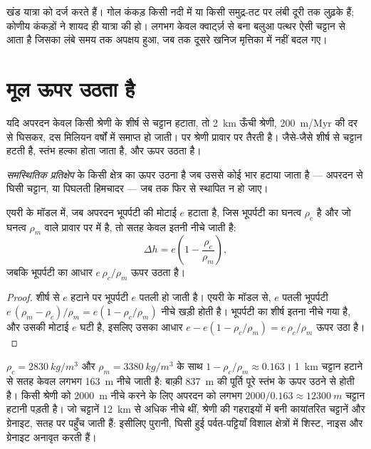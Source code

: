 खंड यात्रा को दर्ज करते हैं। गोल कंकड़ किसी नदी में या किसी समुद्र-तट पर
लंबी दूरी तक लुढ़के हैं; कोणीय कंकड़ों ने शायद ही यात्रा की हो। लगभग केवल क्वार्ट्ज़
से बना बलुआ पत्थर ऐसी चट्टान से आता है जिसका लंबे समय तक अपक्षय हुआ,
जब तक दूसरे खनिज मृत्तिका में नहीं बदल गए।

\section{मूल ऊपर उठता है}

यदि अपरदन केवल किसी श्रेणी के शीर्ष से चट्टान हटाता, तो \qty{2}{km}
ऊँची श्रेणी, \qty{200}{m/Myr} की दर से घिसकर, दस मिलियन वर्षों में समाप्त हो जाती।
पर श्रेणी प्रावार पर तैरती है। जैसे-जैसे शीर्ष से चट्टान हटती है,
स्तंभ हल्का होता जाता है, और ऊपर उठता है।

\begin{definition}[समस्थितिक प्रतिक्षेप]\label{def:g12:destruction-of-mountains:rebound}
\emph{समस्थितिक प्रतिक्षेप}  के किसी क्षेत्र का
ऊपर उठना है जब उससे कोई भार हटाया जाता है --- अपरदन से घिसी चट्टान,
या पिघलती हिमचादर --- जब तक  फिर से स्थापित न हो जाए।
\end{definition}

\begin{proposition}[अपरदन और प्रतिक्षेप]\label{prop:g12:destruction-of-mountains:rebound}
एयरी के मॉडल में, जब अपरदन भूपर्पटी की मोटाई $e$ हटाता है, जिस भूपर्पटी का घनत्व
$\rho_c$ है और जो घनत्व $\rho_m$ वाले प्रावार पर  में है, तो
सतह केवल इतनी नीचे जाती है:
\[
  \Delta h = e\left(1 - \frac{\rho_c}{\rho_m}\right),
\]
जबकि भूपर्पटी का आधार $e\,\rho_c/\rho_m$ ऊपर उठता है।
\end{proposition}

\begin{proof}
शीर्ष से $e$ हटाने पर भूपर्पटी $e$ पतली हो जाती है। एयरी के मॉडल से,
$e$ पतली भूपर्पटी $e\,(\rho_m - \rho_c)/\rho_m = e(1 -
\rho_c/\rho_m)$ नीचे खड़ी होती है। भूपर्पटी का शीर्ष इतना नीचे गया है, और उसकी
मोटाई $e$ घटी है, इसलिए उसका आधार $e - e(1 -
\rho_c/\rho_m) = e\,\rho_c/\rho_m$ ऊपर उठा है।
\end{proof}

$\rho_c = \qty{2830}{kg/m^3}$ और $\rho_m = \qty{3380}{kg/m^3}$ के साथ $1 -
\rho_c/\rho_m \approx 0.163$। \qty{1}{km} चट्टान हटाने से
सतह केवल लगभग \qty{163}{m} नीचे जाती है: बाक़ी \qty{837}{m} की पूर्ति
पूरे स्तंभ के ऊपर उठने से होती है। किसी श्रेणी को \qty{2000}{m} नीचे करने के लिए अपरदन को
लगभग $2000/0.163 \approx \qty{12300}{m}$ चट्टान हटानी पड़ती है। जो चट्टानें
\qty{12}{km} से अधिक नीचे थीं, श्रेणी की गहराइयों में बनी कायांतरित चट्टानें और ग्रेनाइट,
सतह पर पहुँच जाती हैं: इसीलिए पुरानी, घिसी हुई पर्वत-पट्टियाँ
विशाल क्षेत्रों में शिस्ट, नाइस और ग्रेनाइट अनावृत करती हैं।

